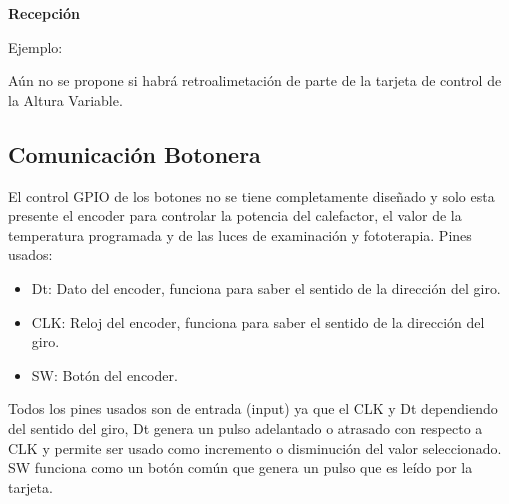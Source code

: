 \documentclass[12pt,a4paper]{article}
\begin{document}
            \textbf{\normalsize{Recepción}}
                \begin{center}
                \end{center}

                Ejemplo:
            
                \begin{center}
                \end{center}
        
                Aún no se propone si habrá retroalimetación de parte de la tarjeta de control de la Altura Variable.
        
        \begin{twocolsection}
            \subsection{Comunicación Botonera}
            El control GPIO de los botones no se tiene completamente diseñado y solo esta presente el encoder para controlar la potencia del calefactor, el valor de la temperatura programada y de las luces de examinación y fototerapia. Pines usados:

            \begin{itemize}
                \item Dt: Dato del encoder, funciona para saber el sentido de la dirección del giro.
                \item CLK: Reloj del encoder, funciona para saber el sentido de la dirección del giro.
                \item SW: Botón del encoder.
            \end{itemize}

            Todos los pines usados son de entrada (input) ya que el CLK y Dt dependiendo del sentido del giro, Dt genera un pulso adelantado o atrasado con respecto a CLK y permite ser usado como incremento o disminución del valor seleccionado. SW funciona como un botón común que genera un pulso que es leído por la tarjeta.
        \end{twocolsection}
\end{document}
